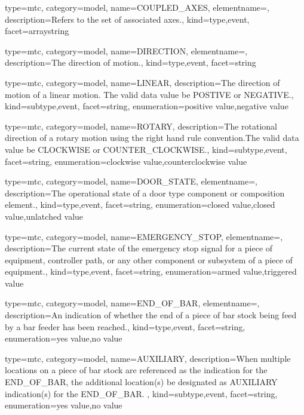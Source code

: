 {
  type=mtc,
  category=model,
  name={COUPLED\_AXES},
  elementname=,
  description={Refers to the set of associated axes.},
  kind={type,event},
  facet={\gls{arraystring}}
}


{
  type=mtc,
  category=model,
  name={DIRECTION},
  elementname=,
  description={The direction of motion.},
  kind={type,event},
  facet={\gls{string}}
}


{
  type=mtc,
  category=model,
  name={LINEAR},
  description={The direction of motion of a linear motion.   The \gls{valid data value} \must be POSTIVE or NEGATIVE.},
  kind={subtype,event},
  facet={\gls{string}},
  enumeration={\gls{positive value},\gls{negative value}}
}


{
  type=mtc,
  category=model,
  name={ROTARY},
  description={The rotational direction of a rotary motion using the right hand rule convention.The \gls{valid data value} \must be CLOCKWISE or COUNTER\_CLOCKWISE.},
  kind={subtype,event},
  facet={\gls{string}},
  enumeration={\gls{clockwise value},\gls{counterclockwise value}}
}


{
  type=mtc,
  category=model,
  name={DOOR\_STATE},
  elementname=,
  description={The operational state of a \gls{door} type component or composition element.},
  kind={type,event},
  facet={\gls{string}},
  enumeration={\gls{closed value},\gls{closed value},\gls{unlatched value}}
}


{
  type=mtc,
  category=model,
  name={EMERGENCY\_STOP},
  elementname=,
  description={The current state of the emergency stop signal for a piece of equipment, controller path, or any other component or subsystem of a piece of equipment.},
  kind={type,event},
  facet={\gls{string}},
  enumeration={\gls{armed value},\gls{triggered value}}
}


{
  type=mtc,
  category=model,
  name={END\_OF\_BAR},
  elementname=,
  description={An indication of whether the end of a piece of bar stock being feed by a bar feeder has been reached.},
  kind={type,event},
  facet={\gls{string}},
  enumeration={\gls{yes value},\gls{no value}}
}


{
  type=mtc,
  category=model,
  name={AUXILIARY},
  description={When multiple locations on a piece of bar stock are referenced as the indication for the END\_OF\_BAR, the additional location(s) \must be designated as AUXILIARY indication(s) for the END\_OF\_BAR.  },
  kind={subtype,event},
  facet={\gls{string}},
  enumeration={\gls{yes value},\gls{no value}}
}


